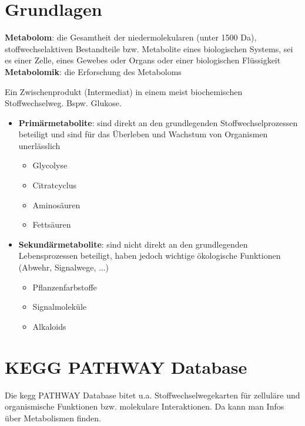 
\section{Grundlagen}
\textbf{Metabolom}: die Gesamtheit der
niedermolekularen (unter 1500 Da), stoffwechselaktiven
Bestandteile bzw. Metabolite eines biologischen Systems,
sei es einer Zelle, eines Gewebes oder Organs oder einer
biologischen Flüssigkeit \\
\textbf{Metabolomik}: die Erforschung des Metaboloms
\begin{mechanism}[title=Definition Metabolit]
Ein Zwischenprodukt (Intermediat) in einem meist biochemischen Stoffwechselweg. Bspw. Glukose. 
\end{mechanism}

\begin{itemize}
    \item \textbf{Primärmetabolite}: sind direkt an den grundlegenden Stoffwechselprozessen beteiligt und sind für das Überleben und Wachstum von Organismen unerlässlich
    \begin{itemize}
        \item Glycolyse
        \item Citratcyclus
        \item Aminosäuren
        \item Fettsäuren
    \end{itemize}
    \item \textbf{Sekundärmetabolite}: sind nicht direkt an den grundlegenden Lebensprozessen beteiligt, haben jedoch wichtige ökologische Funktionen (Abwehr, Signalwege, ...)
    \begin{itemize}
        \item Pflanzenfarbstoffe
        \item Signalmoleküle
        \item \glspl{Alkaloid} 
    \end{itemize}
\end{itemize}


\section{KEGG PATHWAY Database}
Die \gls{kegg} PATHWAY Database bitet u.a. Stoffwechselwegekarten für zelluläre und organismische Funktionen bzw. molekulare Interaktionen. Da kann man Infos über Metabolismen finden. 


